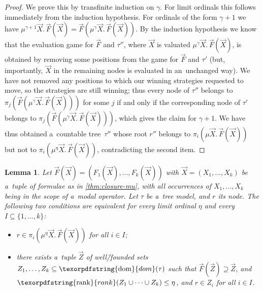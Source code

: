 \documentclass[11pt,a4paper]{amsart}
\theoremstyle{plain}
\newtheorem{lem}[thm]{Lemma}
\theoremstyle{definition}
\theoremstyle{defC}
\theoremstyle{thmC}
\theoremstyle{plain}
\numberwithin{equation}{section}
\numberwithin{equation}{section}
\numberwithin{figure}{section}
\newcommand{\ident}[1]{\ensuremath{\texorpdfstring{\mathrm{\mathnm{#1}}}{#1}}\xspace}
\newcommand{\dom}{\ident{dom}}
\newcommand{\mathnm}[1]{#1}
\newcommand{\rank}{\ident{rank}}
\begin{document}
\begin{proof}
	We prove this by transfinite induction on $\gamma$.
	For limit ordinals this follows immediately from the induction hypothesis.
	For ordinals of the form $\gamma+1$ we have $\mu^{\gamma+1}\vec{X}.\,\vec{F}(\vec{X})=\vec{F}(\mu^\gamma\vec{X}.\,\vec{F}(\vec{X}))$.
	By the induction hypothesis we know that the evaluation game for $\vec{F}$ and $\tau''$,
	where $\vec{X}$ is valuated $\mu^\gamma\vec{X}.\,\vec{F}(\vec{X})$, is obtained by removing some positions from the game for $\vec{F}$ and $\tau'$
	(but, importantly, $\vec{X}$ in the remaining nodes is evaluated in an~unchanged way).
	We have not removed any positions to which our winning strategies requested to move, so the strategies are still winning;
	thus every node of $\tau''$ belongs to $\pi_j(\vec{F}(\mu^\gamma\vec{X}.\,\vec{F}(\vec{X})))$ for some $j$
	if and only if the corresponding node of $\tau'$ belongs to $\pi_j(\vec{F}(\mu^\gamma\vec{X}.\,\vec{F}(\vec{X})))$, which gives the claim for $\gamma+1$.
	We have thus obtained a~countable tree~$\tau''$ whose root $r''$ belongs to $\pi_i(\mu\vec{X}.\,\vec{F}(\vec{X}))$ but not to $\pi_i(\mu^\eta\vec{X}.\,\vec{F}(\vec{X}))$, contradicting the second item.
\end{proof}

\begin{lem}\label{lem:mu-tree2}
	Let $\vec{F}(\vec{X})=(F_1(\vec{X}),\dots,F_k(\vec{X}))$ with $\vec{X}=(X_1,\dots,X_k)$ be a~tuple of formulae as in \cref{thm:closure-mu}, with all occurrences of $X_1,\dots,X_k$ being in the scope of a~modal operator.
	Let $\tau$ be a~tree model, and $r$ its node.
	The following two conditions are equivalent for every limit ordinal $\eta$ and every $I\subseteq\{1,\dots,k\}$:
	\begin{itemize}
	\item	$r\in\pi_i(\mu^\eta\vec{X}.\,\vec{F}(\vec{X}))$ for all $i\in I$;
	\item	there exists a~tuple $\vec{Z}$ of well\=/founded sets $Z_1,\dots,Z_k\subseteq\dom(\tau)$
		such that $\vec{F}(\vec{Z})\supseteq\vec{Z}$, and $\rank(Z_1\cup\dots\cup Z_k)\leq\eta$, and $r\in Z_i$ for all $i\in I$.
	\end{itemize}
\end{lem}
\end{document}
